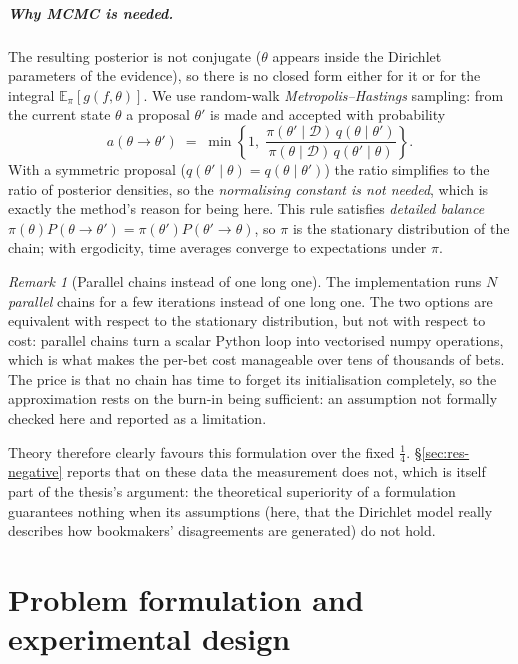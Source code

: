 \documentclass[12pt,a4paper,oneside]{report}
\renewcommand{\_}{\oldunderscore\allowbreak}
\theoremstyle{definition}
\theoremstyle{plain}
\theoremstyle{remark}
\newtheorem{remark}[theorem]{Remark}
\begin{document}
\paragraph{Why MCMC is needed.} The resulting posterior is not conjugate ($\theta$ appears
inside the Dirichlet parameters of the evidence), so there is no closed form either for it or
for the integral $\mathbb{E}_{\pi}[g(f,\theta)]$. We use random-walk
\emph{Metropolis--Hastings} sampling: from the current state $\theta$ a proposal $\theta'$ is
made and accepted with probability \[ a(\theta\to\theta') \;=\; \min\!\left\{1,\;
\frac{\pi(\theta'\mid\mathcal{D})\,q(\theta\mid\theta')}{\pi(\theta\mid\mathcal{D})\,q(\theta'\mid\theta)}\right\}.
\] With a symmetric proposal ($q(\theta'\mid\theta)=q(\theta\mid\theta')$) the ratio simplifies
to the ratio of posterior densities, so the \emph{normalising constant is not needed}, which is
exactly the method's reason for being here. This rule satisfies \emph{detailed balance}
$\pi(\theta)P(\theta\to\theta') = \pi(\theta')P(\theta'\to\theta)$, so $\pi$ is the stationary
distribution of the chain; with ergodicity, time averages converge to expectations under $\pi$.

\begin{remark}[Parallel chains instead of one long one]
The implementation runs $N$ \emph{parallel} chains for a few iterations instead of one long one.
The two options are equivalent with respect to the stationary distribution, but not with respect
to cost: parallel chains turn a scalar Python loop into vectorised numpy operations, which is
what makes the per-bet cost manageable over tens of thousands of bets. The price is that no chain
has time to forget its initialisation completely, so the approximation rests on the burn-in being
sufficient: an assumption not formally checked here and reported as a limitation.
\end{remark}

Theory therefore clearly favours this formulation over the fixed $\tfrac14$.
\S\ref{sec:res-negative} reports that on these data the measurement does not, which is itself
part of the thesis's argument: the theoretical superiority of a formulation guarantees nothing
when its assumptions (here, that the Dirichlet model really describes how bookmakers'
disagreements are generated) do not hold.

\chapter{Problem formulation and experimental design}
\label{ch:data}
\end{document}
